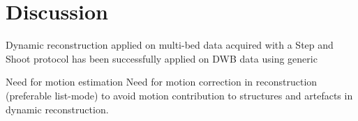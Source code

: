 \chapter{Discussion}
Dynamic reconstruction applied on multi-bed data acquired with a Step and Shoot protocol has been successfully applied on DWB data using generic 


Need for motion estimation 
Need for motion correction in reconstruction (preferable list-mode) to avoid motion contribution to structures and artefacts in dynamic reconstruction. 